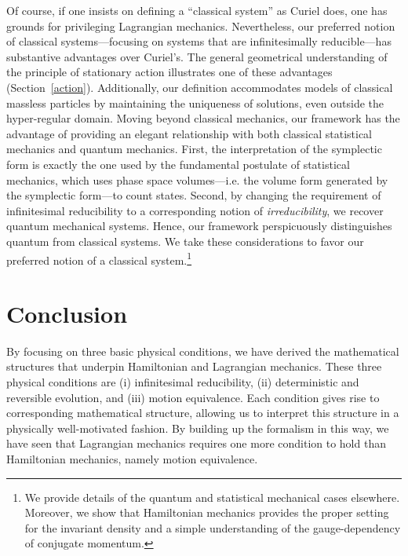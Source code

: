 \documentclass[12pt, english, twoside]{article} %
\begin{document}
Of course, if one insists on defining a ``classical system'' as Curiel does, one has grounds for privileging Lagrangian mechanics. Nevertheless, our preferred notion of classical systems---focusing on systems that are infinitesimally reducible---has substantive advantages over Curiel's. The general geometrical understanding of the principle of stationary action illustrates one of these advantages (Section~\ref{action}). Additionally, our definition accommodates models of classical massless particles by maintaining the uniqueness of solutions, even outside the hyper-regular domain. Moving beyond classical mechanics, our framework has the advantage of providing an elegant relationship with both classical statistical mechanics and quantum mechanics. First, the interpretation of the symplectic form is exactly the one used by the fundamental postulate of statistical mechanics, which uses phase space volumes---i.e. the volume form generated by the symplectic form---to count states. Second, by changing the requirement of infinitesimal reducibility to a corresponding notion of \textit{irreducibility}, we recover quantum mechanical systems. Hence, our framework perspicuously distinguishes quantum from classical systems. We take these considerations to favor our preferred notion of a classical system.\footnote{We provide details of the quantum and statistical mechanical cases elsewhere. Moreover, we show that Hamiltonian mechanics provides the proper setting for the invariant density and a simple understanding of the gauge-dependency of conjugate momentum.}  


\section{Conclusion}
\label{conclusion}

By focusing on three basic physical conditions, we have derived the mathematical structures that underpin Hamiltonian and Lagrangian mechanics. These three physical conditions are (i) infinitesimal reducibility, (ii) deterministic and reversible evolution, and (iii) motion equivalence. Each condition gives rise to corresponding mathematical structure, allowing us to interpret this structure in a physically well-motivated fashion. By building up the formalism in this way, we have seen that Lagrangian mechanics requires one more condition to hold than Hamiltonian mechanics, namely motion equivalence.
\end{document}
